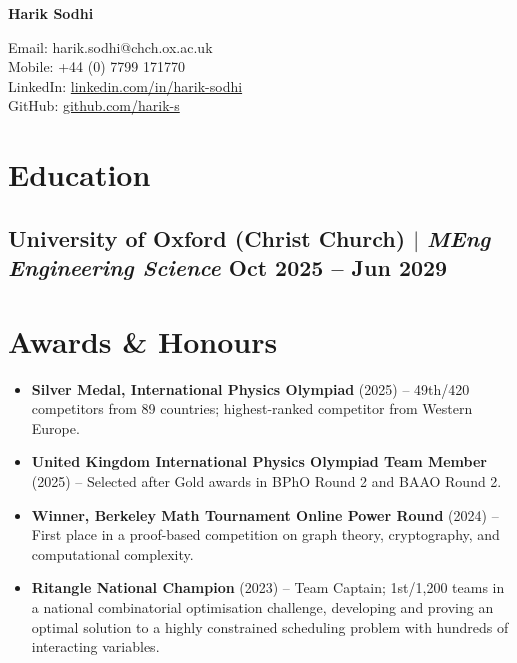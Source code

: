 \documentclass[9pt]{article} %
\begin{document}
\begin{center}
    \begin{minipage}{0.45\textwidth}
        {\Huge\bfseries
            Harik Sodhi %
        } \\ \medskip
    \end{minipage} \hfill
    \begin{minipage}{0.5\textwidth}
        \raggedleft
        Email: harik.sodhi@chch.ox.ac.uk \\
        Mobile: +44 (0) 7799 171770 \\
        LinkedIn: \href{https://linkedin.com/in/harik-sodhi}{linkedin.com/in/harik-sodhi}\\
        GitHub: \href{https://github.com/harik-s}{github.com/harik-s}\\
    \end{minipage}
\end{center}

\section{Education}

\subsection{University of Oxford (Christ Church) $|$ {\normalfont\itshape MEng Engineering Science} \hfill Oct 2025 -- Jun 2029}

\section{Awards \& Honours}

\begin{itemize}[leftmargin=*]
    \item \textbf{Silver Medal, International Physics Olympiad} (2025) -- 49th/420 competitors from 89 countries; highest-ranked competitor from Western Europe.
    
    \item \textbf{United Kingdom International Physics Olympiad Team Member} (2025) -- Selected after Gold awards in BPhO Round 2 and BAAO Round 2.
    
    \item \textbf{Winner, Berkeley Math Tournament Online Power Round} (2024) -- First place in a proof-based competition on graph theory, cryptography, and computational complexity.
    
	\item \textbf{Ritangle National Champion} (2023) -- Team Captain; 1st/1,200 teams in a national combinatorial optimisation challenge, developing and proving an optimal solution to a highly constrained scheduling problem with hundreds of interacting variables.
\end{itemize}
\end{document}
